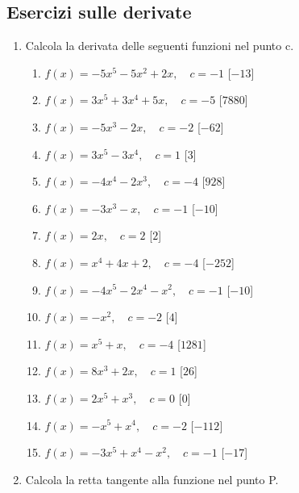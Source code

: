 \subsection{Esercizi sulle derivate}
\begin{enumerate}

\item Calcola la derivata delle seguenti funzioni nel punto c.

\begin{enumerate}
\item \(f(x)= - 5 x^{5} - 5 x^{2} + 2 x,\quad c=-1\) \hfill [\(-13\)]
\item \(f(x)= 3 x^{5} + 3 x^{4} + 5 x,\quad c=-5\) \hfill [\(7880\)]
\item \(f(x)= - 5 x^{3} - 2 x,\quad c=-2\) \hfill [\(-62\)]
\item \(f(x)= 3 x^{5} - 3 x^{4},\quad c=1\) \hfill [\(3\)]
\item \(f(x)= - 4 x^{4} - 2 x^{3},\quad c=-4\) \hfill [\(928\)]
\item \(f(x)= - 3 x^{3} - x,\quad c=-1\) \hfill [\(-10\)]
\item \(f(x)= 2 x,\quad c=2\) \hfill [\(2\)]
\item \(f(x)= x^{4} + 4 x + 2,\quad c=-4\) \hfill [\(-252\)]
\item \(f(x)= - 4 x^{5} - 2 x^{4} - x^{2},\quad c=-1\) \hfill [\(-10\)]
\item \(f(x)= - x^{2},\quad c=-2\) \hfill [\(4\)]
\item \(f(x)= x^{5} + x,\quad c=-4\) \hfill [\(1281\)]
\item \(f(x)= 8 x^{3} + 2 x,\quad c=1\) \hfill [\(26\)]
\item \(f(x)= 2 x^{5} + x^{3},\quad c=0\) \hfill [\(0\)]
\item \(f(x)= - x^{5} + x^{4},\quad c=-2\) \hfill [\(-112\)]
\item \(f(x)= - 3 x^{5} + x^{4} - x^{2},\quad c=-1\) \hfill [\(-17\)]
 \end{enumerate}


\item Calcola la retta tangente alla funzione nel punto P.


\end{enumerate}
